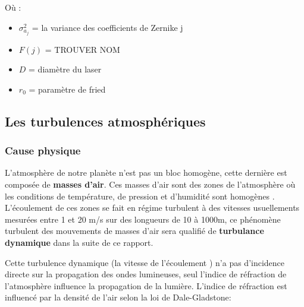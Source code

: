 Où :
\begin{itemize}
  \item $\sigma_{a_j}^2$ = la variance des coefficients de Zernike j
  \item  $F(j)$ = \color{red} TROUVER NOM \color{black}
  \item $D$ = diamètre du laser
  \item $r_0$ = paramètre de fried
\end{itemize}

\subsection{Les turbulences atmosphériques}

\subsubsection{Cause physique}
L'atmosphère de notre planète n'est pas un bloc homogène, cette dernière est composée de \textbf{masses d'air}. Ces masses d'air
sont des zones de l'atmosphère où les conditions de température, de pression et d'humidité sont homogènes \cite{masse_air_wiki}\cite{masse_air_unige}.
L'écoulement de ces zones se fait en régime turbulent à des vitesses usuellements mesurées entre 1 et 20 m/s sur des longueurs de 10 à 1000m, ce phénomène
turbulent des mouvements de masses d'air sera qualifié de \textbf{turbulance dynamique} dans la suite de ce rapport.

Cette turbulence dynamique (la vitesse de l'écoulement ) n'a pas d'incidence directe sur la propagation des ondes lumineuses, seul l'indice de réfraction de l'atmosphère influence la propagation
de la lumière. L'indice de réfraction est influencé par la densité de l'air selon la loi de Dale-Gladstone:



